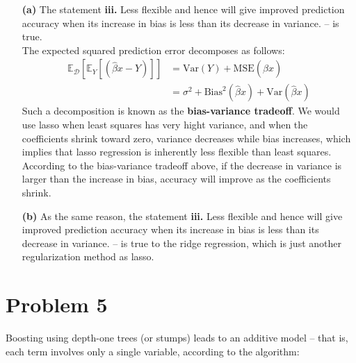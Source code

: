 \documentclass[twoside,11pt]{homework}
\begin{document}
\begin{enumerate}
	
\item[\textbf{(a)}] The statement \textbf{iii.} Less flexible and hence will give improved prediction accuracy when its increase in bias is less than its decrease in variance. -- is true.\\

The expected squared prediction error decomposes as follows:
 \begin{align*}
\mathbb{E_\mathcal{D}} [\mathbb{E} _Y  [( \hat{\beta} x - Y )] ]
&= \mathrm{Var}(Y) + \mathrm{MSE}(\hat{\beta} x) \\
&= \sigma^2 + \mathrm{Bias}^2 (\hat{\beta} x)  +  \mathrm{Var}(\hat{\beta} x) 
 \end{align*}
Such a decomposition is known as the \textbf{bias-variance tradeoff}. We would use lasso when least squares has very hight variance, and when the coefficients shrink toward zero, variance decreases while bias increases, which implies that lasso regression is inherently less flexible than least squares.  According to the bias-variance tradeoff above, if the decrease in variance is larger than the increase in bias, accuracy will improve as the coefficients shrink.

\item[\textbf{(b)}] As the same reason, the statement \textbf{iii.} Less flexible and hence will give improved prediction accuracy when its increase in bias is less than its decrease in variance. -- is true to the ridge regression, which is just another regularization method as lasso.


\end{enumerate}


\section*{Problem 5}


Boosting using depth-one trees (or stumps) leads to an additive model -- that is, each term involves only a single variable, according to the algorithm:
\end{document}
